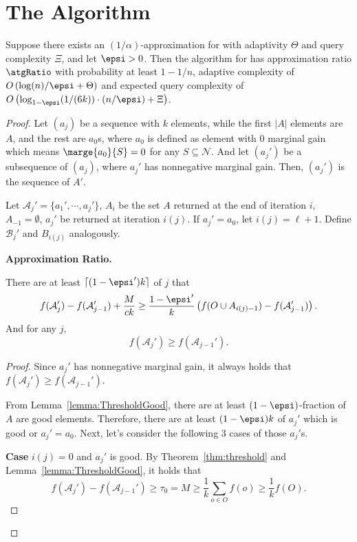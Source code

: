\section{The \adaptg Algorithm}
 
 \begin{theorem} \label{thm:atg}
    Suppose there exists an $(1/\alpha)$-approximation for
    \unc with adaptivity $\Theta$ and query complexity
    $\Xi$, and let $\epsi> 0$.
    Then the algorithm \adaptg  for \sm
    has approximation ratio
    $\atgRatio$ with probability at
    least $1 - 1/n$,
    adaptive complexity of
    $O\left( \log( n ) / \epsi + \Theta \right)$ 
    and expected query complexity of
    $O \left( \log_{1 - \epsi}(1/(6k)) \cdot \left( n / \epsi \right) + \Xi \right)$.
\end{theorem}
\begin{proof}
  Let $(a_j)$ be a sequence with $k$ elements, 
  while the first $|A|$ elements are $A$,
  and the rest are $a_0$s, where 
  $a_0$ is defined as element with 0 marginal gain which means $\marge{a_0}{S}=0$
  for any $S \subseteq \mathcal{N}$.
  And let $(a_j')$ be a subsequence of $(a_j)$, where $a_j'$ has nonnegative marginal gain.
  Then, $(a_j')$ is the sequence of $A'$.

  Let $\mathcal{A}_j'=\{a_1',\cdots,a_j'\}$, 
  $A_i$ be the set $A$ returned at the end of iteration $i$,
  $A_{-1}=\emptyset$,
  $a_j'$ be returned at iteration $i(j)$.
  If $a_j'=a_0$, let $i(j)=\ell+1$.
  Define $\mathcal{B}_j'$ and $B_{i(j)}$ analogously.

  \textbf{Approximation Ratio.}
  \begin{lemma} \label{lemma:seq1}
    There are at least $\lceil(1-\epsi')k\rceil$ of $j$ that 
    $$f(\mathcal{A}_j')-f(\mathcal{A}_{j-1}')+\frac{M}{ck}\ge 
    \frac{1-\epsi'}{k}\left(f(O\cup A_{i(j)-1})-f(\mathcal{A}_{j-1}')\right).$$
    And for any $j$,
    $$f(\mathcal{A}_j')\ge f(\mathcal{A}_{j-1}').$$
  \end{lemma}
  \begin{proof}
    Since $a_j'$ has nonnegative marginal gain, it always holds that 
    $f(\mathcal{A}_j')\ge f(\mathcal{A}_{j-1}')$.

    From Lemma~\ref{lemma:ThresholdGood}, there are at least $(1-\epsi)$-fraction
    of $A$ are good elements.
    Therefore, there are at least $(1-\epsi)k$ of $a_j'$ which is good 
    or $a_j'=a_0$.
    Next, let's consider the following 3 cases of those $a_j'$s.

    \textbf{Case} $i(j)=0$ and $a_j'$ is good.
    By Theorem~\ref{thm:threshold} and Lemma~\ref{lemma:ThresholdGood}, it holds that 
    $$f(\mathcal{A}_j')-f(\mathcal{A}_{j-1}')\ge \tau_0=M \ge \frac{1}{k} \sum_{o \in O}f(o)\ge \frac{1}{k}f(O).$$


\end{proof}
\end{proof}
